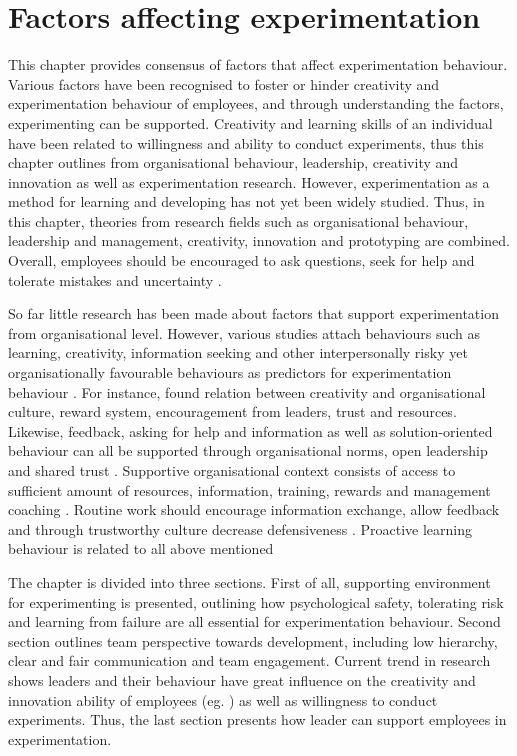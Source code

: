 \chapter{Factors affecting experimentation}
This chapter provides consensus of factors that affect experimentation behaviour. Various factors have been recognised to foster or hinder creativity and experimentation behaviour of employees, and through understanding the factors, experimenting can be supported. Creativity and learning skills of an individual have been related to willingness and ability to conduct experiments, thus this chapter outlines from organisational behaviour, leadership, creativity and innovation as well as experimentation research. However, experimentation as a method for learning and developing has not yet been widely studied. Thus, in this chapter, theories from research fields such as organisational behaviour, leadership and management, creativity, innovation and prototyping are combined. Overall, employees should be encouraged to ask questions, seek for help and tolerate mistakes and uncertainty \citep{edmondson1999psychological}.

So far little research has been made about factors that support experimentation from organisational level. However, various studies attach behaviours such as learning, creativity, information seeking and other interpersonally risky yet organisationally favourable behaviours as predictors for experimentation behaviour \citep{lee2004mixed,amabile1996,argyris1994good,edmondson1996learning,edmondson2003speaking}. For instance, \citet{amabile1996assessing} found relation between creativity and organisational culture, reward system, encouragement from leaders, trust and resources. Likewise, feedback, asking for help and information as well as solution-oriented behaviour can all be supported through organisational norms, open leadership and shared trust \citep{ashford1992conveying,ashford1998out,lee1997going,morrison1993newcomer}. Supportive organisational context consists of access to sufficient amount of resources, information, training, rewards and management coaching \citep{edmondson1996learning}. Routine work should encourage information exchange, allow feedback and through trustworthy culture decrease defensiveness \citep{argyris1994good}. Proactive learning behaviour is related to all above mentioned \citep{edmondson2003speaking}

The chapter is divided into three sections. First of all, supporting environment for experimenting is presented, outlining how psychological safety, tolerating risk and learning from failure are all essential for experimentation behaviour. Second section outlines team perspective towards development, including low hierarchy, clear and fair communication and team engagement. Current trend in research shows leaders and their behaviour have great influence on the creativity and innovation ability of employees (eg. \citep{mumford2002leading,jung2001transformational,amabile1998kill}) as well as willingness to conduct experiments. Thus, the last section presents how leader can support employees in experimentation. 

